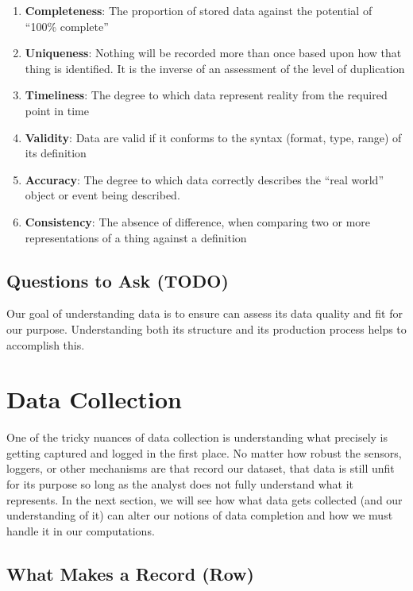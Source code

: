 \documentclass[
]{krantz}
\providecommand{\tightlist}{%
  \setlength{\itemsep}{0pt}\setlength{\parskip}{0pt}}
\begin{document}
\begin{enumerate}
\def\labelenumi{\arabic{enumi}.}
\tightlist
\item
  \textbf{Completeness}: The proportion of stored data against the potential of ``100\% complete''
\item
  \textbf{Uniqueness}: Nothing will be recorded more than once based upon how that thing is identified. It is the inverse of an assessment of the level of duplication
\item
  \textbf{Timeliness}: The degree to which data represent reality from the required point in time
\item
  \textbf{Validity}: Data are valid if it conforms to the syntax (format, type, range) of its definition
\item
  \textbf{Accuracy}: The degree to which data correctly describes the ``real world'' object or event
  being described.
\item
  \textbf{Consistency}: The absence of difference, when comparing two or more representations of a
  thing against a definition
\end{enumerate}

\hypertarget{questions-to-ask-todo}{%
\subsection{Questions to Ask (TODO)}\label{questions-to-ask-todo}}

Our goal of understanding data is to ensure can assess its data quality and fit for our purpose. Understanding both its structure and its production process helps to accomplish this.

\hypertarget{data-collection}{%
\section{Data Collection}\label{data-collection}}

One of the tricky nuances of data collection is understanding what precisely is getting captured and logged in the first place.
No matter how robust the sensors, loggers, or other mechanisms are that record our dataset, that data is still unfit for its purpose so long as the analyst does not fully understand what it represents.
In the next section, we will see how what data gets collected (and our understanding of it) can alter our notions of data completion and how we must handle it in our computations.

\hypertarget{what-makes-a-record-row}{%
\subsection{What Makes a Record (Row)}\label{what-makes-a-record-row}}
\end{document}
